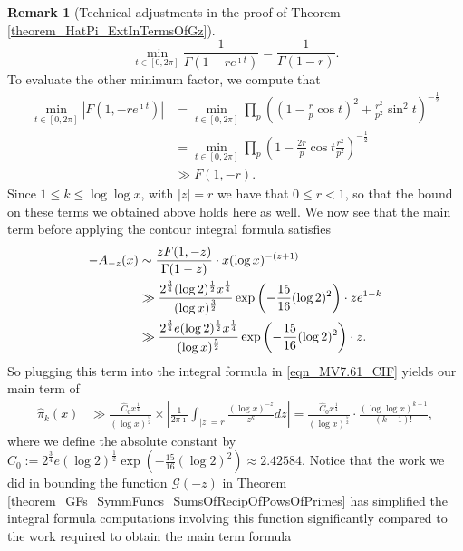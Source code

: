 \documentclass[11pt,reqno,a4letter]{article}
\numberwithin{figure}{section}
\numberwithin{table}{section}
\theoremstyle{plain}
\numberwithin{theorem}{section}
\theoremstyle{definition}
\newtheorem{remark}[theorem]{Remark}
\begin{document}
\begin{remark}[Technical adjustments in the proof of Theorem \ref{theorem_HatPi_ExtInTermsOfGz}]
\[
\min\limits_{t \in [0, 2\pi]} \frac{1}{\Gamma\left(1-re^{\imath t}\right)} = \frac{1}{\Gamma(1-r)}. 
\]
To evaluate the other minimum factor, we compute that 
\begin{align*} 
\min\limits_{t \in [0, 2\pi]} \left\lvert 
     F\left(1, -re^{\imath t}\right) \right\rvert & = \min\limits_{t \in [0, 2\pi]} 
     \prod_p \left(\left(1 - \frac{r}{p} \cos t\right)^2 + \frac{r^2}{p^2} \sin^2 t\right)^{-\frac{1}{2}} \\ 
     & = \min\limits_{t \in [0, 2\pi]} \prod_p 
     \left(1 - \frac{2r}{p} \cos t \frac{r^2}{p^2}\right)^{-\frac{1}{2}} \\ 
     & \gg F(1, -r). 
\end{align*} 
Since $1 \leq k \leq \log\log x$, with $|z| = r$ we have that $0 \leq r < 1$, so that the bound on these 
terms we obtained above holds here as well.
We now see that the main term before applying the contour integral formula satisfies 
\begin{align} 
\notag 
-A_{-z}(x) & \sim \frac{z F(1, -z)}{\Gamma(1-z)} \cdot x (\log x)^{-(z+1)} \\ 
\notag 
     & \gg \frac{2^{\frac{3}{4}} (\log 2)^{\frac{1}{2}} x^{\frac{1}{4}}}{(\log x)^{\frac{3}{2}}} 
     \exp\left(-\frac{15}{16} (\log 2)^2\right) \cdot z e^{1-k} \\ 
\label{eqn_AbsAmzx_LowerBoundFormula_v2} 
     & \gg \frac{2^{\frac{3}{4}} e (\log 2)^{\frac{1}{2}} x^{\frac{1}{4}}}{(\log x)^{\frac{5}{2}}} 
     \exp\left(-\frac{15}{16} (\log 2)^2\right) \cdot z. 
\end{align} 
So plugging this term into the integral formula in \eqref{eqn_MV7.61_CIF} 
yields our main term of 
\begin{align} 
\label{eqn_HatPikx_LowerBoundFormula_v3} 
\widehat{\pi}_k(x) & \gg \frac{\widehat{C}_0 x^{\frac{1}{4}}}{(\log x)^{\frac{5}{2}}} 
     \times \left\lvert \frac{1}{2\pi\imath} 
     \int_{|z|=r} \frac{(\log x)^{-z}}{z^k} dz \right\rvert 
     = \frac{\widehat{C}_0 x^{\frac{1}{4}}}{(\log x)^{\frac{5}{2}}} \cdot 
     \frac{(\log\log x)^{k-1}}{(k-1)!}, 
\end{align} 
where we define the absolute constant by 
$\widehat{C}_0 := 2^{\frac{3}{4}} e (\log 2)^{\frac{1}{2}} 
 \exp\left(-\frac{15}{16} (\log 2)^2\right) \approx 2.42584$. 
Notice that the work we did in bounding the function $\mathcal{G}(-z)$ in 
Theorem \ref{theorem_GFs_SymmFuncs_SumsOfRecipOfPowsOfPrimes} 
has simplified the integral formula computations involving this function 
significantly compared to the work required to obtain the main term formula 

\end{remark}
\end{document}

